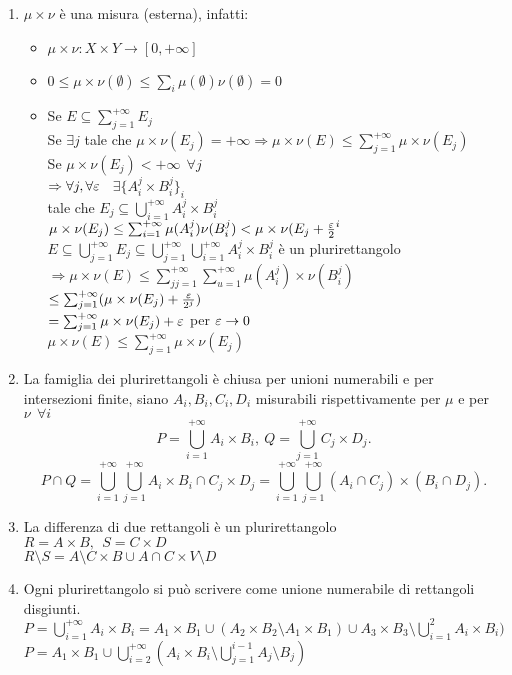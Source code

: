 \documentclass[12px]{article}
\begin{document}
  \begin{enumerate}
	  \item $\mu\times\nu$ è una misura (esterna), infatti:
		   \begin{itemize}
			   \item $\mu \times \nu : X\times Y \rightarrow [0,+\infty]$ 
			   \item $0\leq \mu\times\nu (\emptyset) \leq \sum^{}_{i}\mu(\emptyset)\nu(\emptyset) =0$
			   \item Se $E\subseteq \sum^{+\infty}_{j = 1}E_j$\\
				   Se $\exists j$ tale che  $\mu\times\nu(E_j) = +\infty \Rightarrow \mu\times \nu(E)\leq \sum^{+\infty}_{j = 1}\mu\times\nu(E_j)$ \\
				   Se $\mu\times\nu(E_j) < +\infty \ \ \forall j$\\
				   $ \Rightarrow  \forall j, \forall \varepsilon$ \ $\exists \{A_i^j\times B_i^j\}_i$\\
				   tale che  $E_j\subseteq \bigcup^{+\infty}_{i= 1}A_i^j\times B_i^j$\\
				   $\mu\times\nu(E_j) \leq \sum^{+\infty}_{i=1}\mu(A^j_i)\nu(B_i^j) < \mu\times \nu(E_j + \frac{\varepsilon}2^i$\\
				   $E\subseteq \bigcup^{+\infty}_{j = 1}E_j\subseteq \bigcup^{+\infty}_{j=1} \bigcup^{+\infty}_{i = 1}A_i^j\times B^j_i$ è un plurirettangolo\\
				   $ \Rightarrow \mu\times\nu(E)\leq \sum^{+\infty}_{jj=1} \sum^{+\infty}_{u = 1}\mu(A_i^j)\times\nu(B_i^j)$\\
				   $\leq \sum^{+\infty}_{j=1}(\mu\times\nu(E_j) + \frac{\varepsilon}{2^j})$\\
				   $= \sum^{+\infty}_{j=1}\mu\times\nu(E_j) + \varepsilon$ per $\varepsilon \rightarrow 0$\\
				   $\mu\times\nu(E)\leq \sum^{+\infty}_{j=1}\mu\times\nu(E_j)$
		  \end{itemize}
	  \item La famiglia dei plurirettangoli è chiusa per unioni numerabili e per intersezioni finite, siano $A_i,B_i,C_i,D_i$ misurabili rispettivamente per  $\mu$ e per  $\nu\ \ \forall i$
		  \[
		  P = \bigcup^{+\infty}_{i=1}A_i\times B_i, \ Q = \bigcup^{+\infty}_{j=1}C_j\times D_j
		  .\] 
		  \[
		  P\cap Q = \bigcup^{+\infty}_{i=1} \bigcup^{+\infty}_{j =1 }A_i\times B_i\cap C_j\times D_j  = \bigcup^{+\infty}_{i=1} \bigcup^{+\infty}_{j=1}(A_i\cap C_j)\times (B_i\cap D_j)
		  	.\] 
		\item La differenza di due rettangoli è un plurirettangolo\\
			$R = A\times B, \ \ S= C\times D$\\
			 $R\setminus S = A\setminus C\times B \cup A\cap C\times V\setminus D$
		 \item Ogni plurirettangolo si può scrivere come unione numerabile di rettangoli disgiunti.
			  $P = \bigcup^{+\infty}_{i=1}A_i\times B_i = A_1\times B_1 \cup (A_2\times B_2\setminus A_1\times B_1) \cup A_3\times B_3\setminus \bigcup^{2}_{i=1}A_i\times B_i)$\\
			  $\displaystyle P = A_1\times B_1 \cup\bigcup^{+\infty}_{i=2}(A_i\times B_i \setminus \bigcup^{i-1}_{j=1}A_j\setminus B_j)$
 \end{enumerate}
\end{document}
